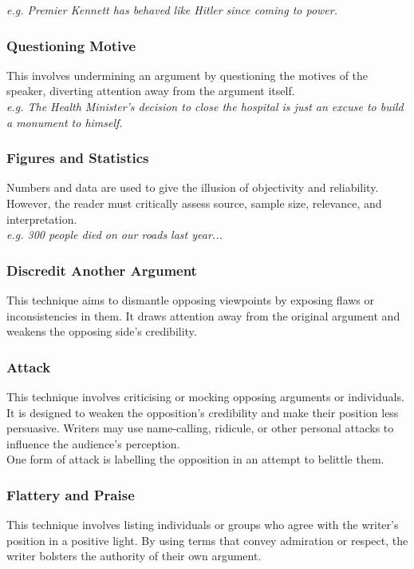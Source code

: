 \documentclass[a4paper]{article}
\begin{document}
\textit{e.g. Premier Kennett has behaved like Hitler since coming to power.}\\

\subsubsection{Questioning Motive}
This involves undermining an argument by questioning the motives of the speaker, diverting attention away from the argument itself.\\

\textit{e.g. The Health Minister’s decision to close the hospital is just an excuse to build a monument to himself.}\\

\subsubsection{Figures and Statistics}
Numbers and data are used to give the illusion of objectivity and reliability. However, the reader must critically assess source, sample size, relevance, and interpretation.\\

\textit{e.g. 300 people died on our roads last year...}\\

\subsubsection{Discredit Another Argument}
This technique aims to dismantle opposing viewpoints by exposing flaws or inconsistencies in them. It draws attention away from the original argument and weakens the opposing side’s credibility.\\

\subsubsection{Attack}
This technique involves criticising or mocking opposing arguments or individuals. It is designed to weaken the opposition's credibility and make their position less persuasive. Writers may use name-calling, ridicule, or other personal attacks to influence the audience’s perception.\\
One form of attack is labelling the opposition in an attempt to belittle them.

\subsubsection{Flattery and Praise}
This technique involves listing individuals or groups who agree with the writer’s position in a positive light. By using terms that convey admiration or respect, the writer bolsters the authority of their own argument.\\
\end{document}
